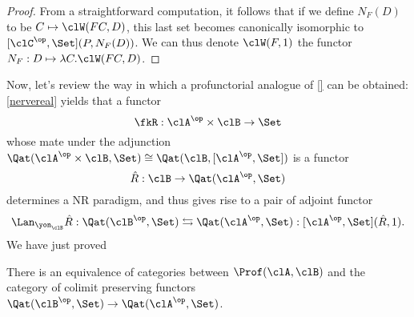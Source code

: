 \documentclass[a4paper]{../birkjour}
\begin{document}
\begin{proof}
	From a straightforward computation, it follows that if we define $N_F(D)$ to be $C\mapsto \clW(F C,D)$, this last set becomes canonically isomorphic to $[\clC^\op,\Set](P,N_F(D))$. We can thus denote $\clW(F,1)$ the functor $N_F : D\mapsto \lambda C.\clW(F C,D)$.
\end{proof}
Now, let's review the way in which a profunctorial analogue of \ref{} can be obtained: \autoref{nervereal} yields that a functor 
\[ \fkR : \clA^\op\times \clB \to \Set \]
whose mate under the adjunction $\Qat(\clA^\op\times \clB ,\Set)\cong\Qat(\clB,[\clA^\op,\Set])$ is a functor 
\[ \hat R : \clB \to \Qat(\clA^\op,\Set) \]
determines a NR paradigm, and thus gives rise to a pair of adjoint functor 
\[ \Lan_{\yon_\clB} \hat R : \Qat(\clB^\op,\Set) \leftrightarrows \Qat(\clA^\op,\Set) : [\clA^\op,\Set](\hat R,1). \]
We have just proved 
\begin{proposition}
  There is an equivalence of categories between $\Prof(\clA,\clB)$ and the category of colimit preserving functors $\Qat(\clB^\op,\Set) \to \Qat(\clA^\op,\Set)$.
\end{proposition}
\end{document}
